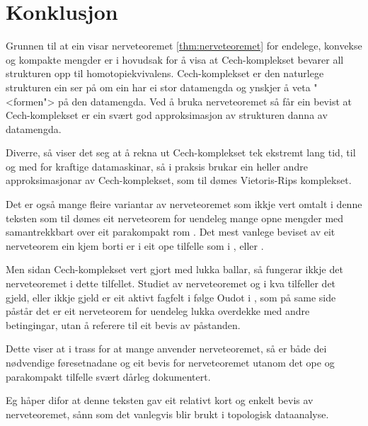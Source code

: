 \documentclass[a4paper, 12pt, norsk]{article}
\theoremstyle{plain}
\theoremstyle{definition}
\begin{document}
\section{Konklusjon}

Grunnen til at ein visar nerveteoremet \autoref{thm:nerveteoremet} for endelege, konvekse og kompakte mengder er i hovudsak for å visa at Cech-komplekset bevarer all strukturen opp til homotopiekvivalens. Cech-komplekset er den naturlege strukturen ein ser på om ein har ei stor datamengda og ynskjer å veta "<formen"> på den datamengda. Ved å bruka nerveteoremet så får ein bevist at Cech-komplekset er ein svært god approksimasjon av strukturen danna av datamengda.

Diverre, så viser det seg at å rekna ut Cech-komplekset tek ekstremt lang tid, til og med for kraftige datamaskinar, så i praksis brukar ein heller andre approksimasjonar av Cech-komplekset, som til dømes Vietoris-Rips komplekset. %

Det er også mange fleire variantar av nerveteoremet som ikkje vert omtalt i denne teksten som til dømes eit nerveteorem for uendeleg mange opne mengder med samantrekkbart over eit parakompakt rom \cite[Corollary 4G.3]{MR1867354}. Det mest vanlege beviset av eit nerveteorem ein kjem borti er i eit ope tilfelle som i \cite[Theorem 15.21]{MR2361455}, \cite[Theorem 4.3]{MR4218370} eller \cite[Theorem 2.3]{MR2476414}.

Men sidan Cech-komplekset vert gjort med lukka ballar, så fungerar ikkje det nerveteoremet i dette tilfellet. Studiet av nerveteoremet og i kva tilfeller det gjeld, eller ikkje gjeld er eit aktivt fagfelt i følge Oudot i \cite[s. 82]{MR3408277}, som på same side påstår det er eit nerveteorem for uendeleg lukka overdekke med andre betingingar, utan å referere til eit bevis av påstanden.

Dette viser at i trass for at mange anvender nerveteoremet, så er både dei nødvendige føresetnadane og eit bevis for nerveteoremet utanom det ope og parakompakt tilfelle svært dårleg dokumentert.

Eg håper difor at denne teksten gav eit relativt kort og enkelt bevis av nerveteoremet, sånn som det vanlegvis blir brukt i topologisk dataanalyse.

{}

\end{document}
